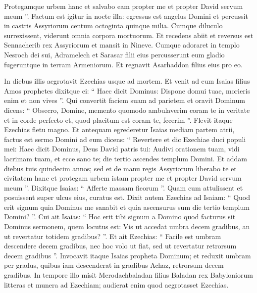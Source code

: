 \begin{biblechapter}
\begin{biblechapter}
\begin{biblechapter}
\begin{biblechapter}
\begin{biblechapter}
\begin{biblechapter}
\begin{biblechapter}
\begin{biblechapter}
\begin{biblechapter}
\begin{biblechapter}
\begin{biblechapter}
\begin{biblechapter}
\begin{biblechapter}
\begin{biblechapter}
\begin{biblechapter}
\begin{biblechapter}
\begin{biblechapter}
\begin{biblechapter}
\begin{biblechapter}
 \verse Protegamque urbem hanc et salvabo eam
 propter me et propter David servum meum ”.
 \verse Factum est igitur in nocte illa: egressus est angelus Domini et percussit in castris Assyriorum centum octoginta quinque milia. Cumque diluculo surrexissent, viderunt omnia corpora mortuorum. 
\verse Et recedens abiit et reversus est Sennacherib rex Assyriorum et mansit in Nineve. 
\verse Cumque adoraret in templo Nesroch dei sui, Adramelech et Sarasar filii eius percusserunt eum gladio fugeruntque in terram Armeniorum. Et regnavit Asarhaddon filius eius pro eo.
 
\begin{biblechapter}
 \verse In diebus illis aegrotavit Ezechias usque ad mortem. Et venit ad eum Isaias filius Amos prophetes dixitque ei: “ Haec dicit Dominus: Dispone domui tuae, morieris enim et non vives ”. 
\verse Qui convertit faciem suam ad parietem et oravit Dominum dicens: 
\verse “ Obsecro, Domine, memento quomodo ambulaverim coram te in veritate et in corde perfecto et, quod placitum est coram te, fecerim ”. Flevit itaque Ezechias fletu magno. 
\verse Et antequam egrederetur Isaias mediam partem atrii, factus est sermo Domini ad eum dicens: 
\verse “ Revertere et dic Ezechiae duci populi mei: Haec dicit Dominus, Deus David patris tui: Audivi orationem tuam, vidi lacrimam tuam, et ecce sano te; die tertio ascendes templum Domini. 
\verse Et addam diebus tuis quindecim annos; sed et de manu regis Assyriorum liberabo te et civitatem hanc et protegam urbem istam propter me et propter David servum meum ”. 
\verse Dixitque Isaias: “ Afferte massam ficorum ”. Quam cum attulissent et posuissent super ulcus eius, curatus est. 
\verse Dixit autem Ezechias ad Isaiam: “ Quod erit signum quia Dominus me sanabit et quia ascensurus sum die tertio templum Domini? ”. 
\verse Cui ait Isaias: “ Hoc erit tibi signum a Domino quod facturus sit Dominus sermonem, quem locutus est: Vis ut accedat umbra decem gradibus, an ut revertatur totidem gradibus? ”. 
\verse Et ait Ezechias: “ Facile est umbram descendere decem gradibus, nec hoc volo ut fiat, sed ut revertatur retrorsum decem gradibus ”. 
 \verse Invocavit itaque Isaias propheta Dominum; et reduxit umbram per gradus, quibus iam descenderat in gradibus Achaz, retrorsum decem gradibus.
 \verse In tempore illo misit Merodachbaladan filius Baladan rex Babyloniorum litteras et munera ad Ezechiam; audierat enim quod aegrotasset Ezechias. 

\end{biblechapter}
\end{biblechapter}
\end{biblechapter}
\end{biblechapter}
\end{biblechapter}
\end{biblechapter}
\end{biblechapter}
\end{biblechapter}
\end{biblechapter}
\end{biblechapter}
\end{biblechapter}
\end{biblechapter}
\end{biblechapter}
\end{biblechapter}
\end{biblechapter}
\end{biblechapter}
\end{biblechapter}
\end{biblechapter}
\end{biblechapter}
\end{biblechapter}
